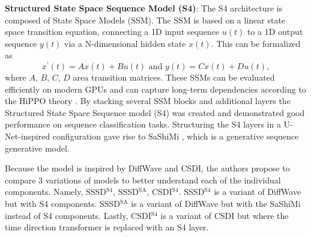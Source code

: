 \textbf{Structured State Space Sequence Model (S4)}:
The S4 architecture is composed of State Space Models (SSM). The SSM \cite{gu_efficiently_2022} is based on a linear state space transition equation, connecting a 1D input sequence $u(t)$ to a 1D output sequence $y(t)$ via a N-dimensional hidden state $x(t)$. This can be formalized as
\begin{equation}
    x^\prime(t) = Ax(t) + Bu(t) \text{ and } y(t) = Cx(t) + Du(t),
\end{equation}
where $A$, $B$, $C$, $D$ area transition matrices. These SSMs can be evaluated efficiently on modern GPUs \cite{gu_efficiently_2022} and can capture long-term dependencies according to the HiPPO theory \cite{gu_hippo_2020, gu_how_2022}. By stacking several SSM blocks and additional layers the Structured State Space Sequence model (S4) was created and demonstrated good performance on sequence classification tasks. Structuring the S4 layers in a U-Net-inspired configuration gave rise to SaShiMi \cite{goel_its_2022}, which is a generative sequence generative model.

Because the model is inspired by DiffWave and CSDI, the authors propose to compare 3 variations of models to better understand each of the individual components. Namely, SSSD$^{\text{S4}}$, SSSD$^{\text{SA}}$, CSDI$^{\text{S4}}$. SSSD$^{\text{S4}}$ is a variant of DiffWave but with S4 components. SSSD$^{\text{SA}}$ is a variant of DiffWave but with the SaShiMi instead of S4 components. Lastly, CSDI$^{\text{S4}}$ is a variant of CSDI but where the time direction transformer is replaced with an S4 layer.

